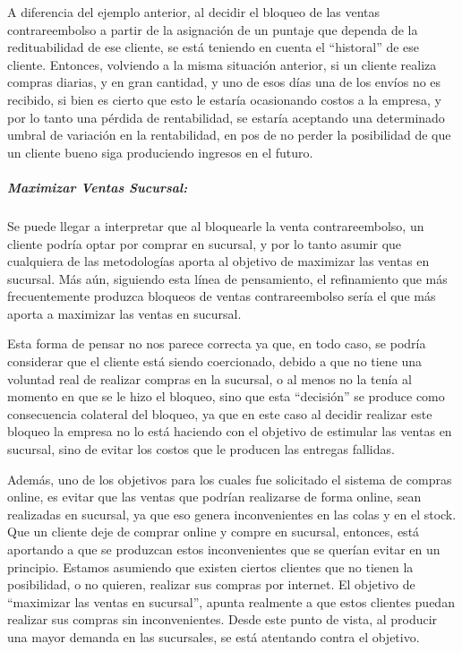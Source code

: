 A diferencia del ejemplo anterior, al decidir el bloqueo de las ventas
contrareembolso a partir de la asignación de un puntaje que dependa de la
redituabilidad de ese cliente, se está teniendo en cuenta el ``historal'' de
ese cliente. Entonces, volviendo a la misma situación anterior, si un cliente
realiza compras diarias, y en gran cantidad, y uno de esos días una de los
envíos no es recibido, si bien es cierto que esto le estaría ocasionando
costos a la empresa, y por lo tanto una pérdida de rentabilidad, se estaría
aceptando una determinado umbral de variación en la rentabilidad, en pos de no
perder la posibilidad de que un cliente bueno siga produciendo ingresos en el
futuro.

\subparagraph{Maximizar Ventas Sucursal:}

Se puede llegar a interpretar que al bloquearle la venta contrareembolso, un
cliente podría optar por comprar en sucursal, y por lo tanto asumir que
cualquiera de las metodologías aporta al objetivo de maximizar las ventas en
sucursal. Más aún, siguiendo esta línea de pensamiento, el refinamiento que
más frecuentemente produzca bloqueos de ventas contrareembolso sería el que
más aporta a maximizar las ventas en sucursal.

Esta forma de pensar no nos parece correcta ya que, en todo caso, se podría
considerar que el cliente está siendo coercionado, debido a que no tiene una
voluntad real de realizar compras en la sucursal, o al menos no la tenía al
momento en que se le hizo el bloqueo, sino que esta ``decisión'' se produce
como consecuencia colateral del bloqueo, ya que en este caso al decidir
realizar este bloqueo la empresa no lo está haciendo con el objetivo de
estimular las ventas en sucursal, sino de evitar los costos que le producen
las entregas fallidas.

Además, uno de los objetivos para los cuales fue solicitado el sistema de
compras online, es evitar que las ventas que podrían realizarse de forma
online, sean realizadas en sucursal, ya que eso genera inconvenientes en las
colas y en el stock. Que un cliente deje de comprar online y compre en
sucursal, entonces, está aportando a que se produzcan estos inconvenientes que
se querían evitar en un principio. Estamos asumiendo que existen ciertos
clientes que no tienen la posibilidad, o no quieren, realizar sus compras por
internet. El objetivo de ``maximizar las ventas en sucursal'', apunta
realmente a que estos clientes puedan realizar sus compras sin inconvenientes.
Desde este punto de vista, al producir una mayor demanda en las sucursales, se
está atentando contra el objetivo.

